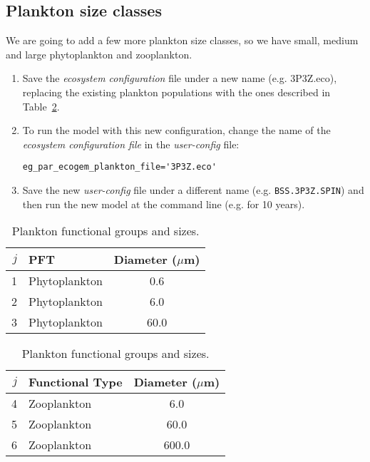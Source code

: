 \documentclass[11pt,fleqn]{book} %
\begin{document}

\subsection{Plankton size classes} We are going to add a few more plankton size classes, so we have small, medium and large phytoplankton and zooplankton.

\begin{enumerate}[noitemsep]
\vspace{1mm}
\item Save the \textit{ecosystem configuration} file under a new name (e.g. \textsf{\footnotesize 3P3Z.eco}), replacing the existing plankton populations with the ones described in Table~\ref{planktonconfig1}.
\vspace{1mm}
\item  To run the model with this new configuration, change the name of the \textit{ecosystem configuration file} in the \textit{user-config} file:
\vspace{-1mm}\begin{verbatim}
eg_par_ecogem_plankton_file='3P3Z.eco'
\end{verbatim}\vspace{-1mm}
\vspace{1mm}
\item Save the new \textit{user-config} file under a different name (e.g. \texttt{BSS.3P3Z.SPIN}) and then run the new model at the command line (e.g. for 10 years).
\end{enumerate}
\vspace{2mm} 

\vspace{-4mm} 
\begin{table}[htp!]
\begin{center}
\caption{Plankton functional groups and sizes.}
\begin{tabular}{rlc}
\hline
$j$     & PFT                   & \multicolumn{1}{r}{Diameter ($\mu$m)}  \\
\hline
1       & Phytoplankton         & 0.6  \\
2       & Phytoplankton         & 6.0  \\
3       & Phytoplankton         & 60.0  \\
\hline 
\end{tabular} 
\begin{tabular}{rlc}
\hline
$j$     & Functional Type       & \multicolumn{1}{r}{Diameter ($\mu$m)}  \\
\hline
4       & Zooplankton           & 6.0  \\
5       & Zooplankton           & 60.0  \\
6       & Zooplankton           & 600.0  \\
\hline 
\end{tabular} 
\label{planktonconfig1}
\end{center}
\end{table}
\vspace{-4mm} 
\end{document}
